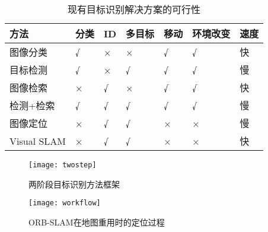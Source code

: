 \begin{table}[htbp]
    \centering
    \caption{\label{table:methods}现有目标识别解决方案的可行性}
    \begin{tabular}{|l|l|l|l|l|l|l|}\hline
    方法 &
      分类 &
      ID &
      多目标 &
      移动 &
      环境改变 &
      速度 \\
      \hline 图像分类\cite{he2019bag} &
      {\color[HTML]{355421} √} &
      {\color[HTML]{BF0000} ×} &
      {\color[HTML]{BF0000} ×} &
      {\color[HTML]{355421} √} &
      {\color[HTML]{355421} √} &
      {\color[HTML]{355421} 快} \\ \hline
    目标检测\cite{zou2019object} &
      {\color[HTML]{355421} √} &
      {\color[HTML]{BF0000} ×} &
      {\color[HTML]{355421} √} &
      {\color[HTML]{355421} √} &
      {\color[HTML]{355421} √} &
      {\color[HTML]{BF0000} 慢} \\ \hline
    图像检索\cite{philbin2008lost,zheng2017sift} &
      {\color[HTML]{BF0000} ×} &
      {\color[HTML]{355421} √} &
      {\color[HTML]{BF0000} ×} &
      {\color[HTML]{355421} √} &
      {\color[HTML]{355421} √} &
      {\color[HTML]{355421} 快} \\ \hline
    检测+检索 &
      {\color[HTML]{355421} √} &
      {\color[HTML]{355421} √} &
      {\color[HTML]{355421} √} &
      {\color[HTML]{355421} √} &
      {\color[HTML]{355421} √} &
      {\color[HTML]{BF0000} 慢} \\ \hline
    图像定位\cite{sattler2011fast} &
      {\color[HTML]{BF0000} ×} &
      {\color[HTML]{355421} √} &
      {\color[HTML]{355421} √} &
      {\color[HTML]{BF0000} ×} &
      {\color[HTML]{BF0000} ×} &
      {\color[HTML]{BF0000} 慢} \\ \hline
    Visual SLAM\cite{liu2021edgesharing} &
      {\color[HTML]{BF0000} ×} &
      {\color[HTML]{355421} √} &
      {\color[HTML]{355421} √} &
      {\color[HTML]{BF0000} ×} &
      {\color[HTML]{BF0000} ×} &
      {\color[HTML]{355421} 快} \\ \hline
    \end{tabular}
    \end{table}

    \begin{figure}[t]
        \centering
        \texttt{[image: twostep]}
        \caption{两阶段目标识别方法框架}
        \label{fig:two-step-workflow}
    \end{figure}

    \begin{figure}[t]
        \centering
        \texttt{[image: workflow]}
        \caption{ORB-SLAM\cite{mur2017orb}在地图重用时的定位过程}
        \label{fig:localization}
    \end{figure}

